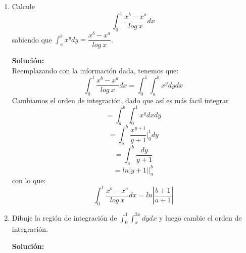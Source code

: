 \documentclass[12pt]{article}
\newenvironment{solucion}
{\begin{mdframed}[backgroundcolor=black!10]
		{\bf Solución:}\\
	}
	{
	\end{mdframed}
}
\newenvironment{preguntas}
{\begin{enumerate}\itemsep12pt
	}
	{
	\end{enumerate}
}
\newcommand{\ev}{\Big|}
\begin{document}
\begin{preguntas}
\begin{solucion}
\begin{enumerate}[a)]
\item $\displaystyle\int_2^4 \displaystyle\int_1^2 ye^{xy}dxdy = 
			\displaystyle\int_2^4 e^{xy} \ev_1^2 dy = 
			\displaystyle\int_2^4 e^{2y} - e^{y} dy =
			\dfrac{1}{2}e^{2y}\ev_2^4 - e^{y}\ev_2^4$\\
			$=\dfrac{1}{2}e^8 - \dfrac{1}{2}e^4 - e^4 + e^2 =
			\dfrac{1}{2}e^8 - \dfrac{3}{2}e^4 + e^2$	
\item $\displaystyle\int_{-1}^1\displaystyle\int_{-1}^1 \dfrac{xy}{1+x^2+y^2}dxdy = 
			\displaystyle\int_{-1}^1 \dfrac{y}{2} \displaystyle\int_{-1}^1 \dfrac{2x}{1+x^2+y^2}dxdy$\\
			$= \displaystyle\int_{-1}^1 \dfrac{y}{2} ln(1+x^2+y^2) \ev_{-1}^1 dy = 
			\displaystyle\int_{-1}^1 \dfrac{y}{2}( ln(2+y^2) - ln(2+y^2) ) dy$\\
			$=0$
\end{enumerate}
\end{solucion}
\item Calcule
	$$ \displaystyle\int_0^1 \dfrac{x^b - x^a}{log\ x}dx$$
	sabiendo que $\displaystyle\int_a^b x^y dy = \dfrac{x^b - x^a}{log\ x}$.
\begin{solucion}
Reemplazando con la información dada, tenemos que:
		$$ \displaystyle\int_0^1 \dfrac{x^b - x^a}{log\ x}dx = \displaystyle\int_0^1 \displaystyle\int_a^b x^y dydx $$
		Cambiamos el orden de integración, dado que así es más facil integrar
		$$ = \displaystyle\int_a^b \displaystyle\int_0^1 x^y dxdy $$
		$$ = \displaystyle\int_a^b \dfrac{x^{y+1}}{y+1} \ev_0^1 dy $$
		$$ = \displaystyle\int_a^b \dfrac{dy}{y+1} $$
		$$ = ln|y+1|\ev_a^b $$
		con lo que:
		$$ \displaystyle\int_0^1 \dfrac{x^b - x^a}{log\ x}dx = ln\left|\dfrac{b+1}{a+1}\right| $$
\end{solucion}
\item Dibuje la región de integración de $\displaystyle\int_0^1 \displaystyle\int_x^{2x} dydx$ y luego cambie el orden de integración.
\begin{solucion}
\begin{center}
\end{center}
\end{solucion}
\end{preguntas}
\end{document}
